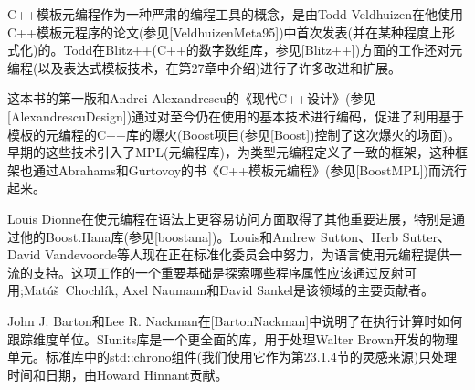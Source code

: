 C++模板元编程作为一种严肃的编程工具的概念，是由Todd Veldhuizen在他使用C++模板元程序的论文(参见[VeldhuizenMeta95])中首次发表(并在某种程度上形式化)的。Todd在Blitz++(C++的数字数组库，参见[Blitz++])方面的工作还对元编程(以及表达式模板技术，在第27章中介绍)进行了许多改进和扩展。

这本书的第一版和Andrei Alexandrescu的《现代C++设计》(参见[AlexandrescuDesign])通过对至今仍在使用的基本技术进行编码，促进了利用基于模板的元编程的C++库的爆火(Boost项目(参见[Boost])控制了这次爆火的场面)。早期的这些技术引入了MPL(元编程库)，为类型元编程定义了一致的框架，这种框架也通过Abrahams和Gurtovoy的书《C++模板元编程》(参见[BoostMPL])而流行起来。

Louis Dionne在使元编程在语法上更容易访问方面取得了其他重要进展，特别是通过他的Boost.Hana库(参见[boostana])。Louis和Andrew Sutton、Herb Sutter、David Vandevoorde等人现在正在标准化委员会中努力，为语言使用元编程提供一流的支持。这项工作的一个重要基础是探索哪些程序属性应该通过反射可用;Mat\'{u}\v{s}\ Chochl\'{i}k, Axel Naumann和David Sankel是该领域的主要贡献者。

John J. Barton和Lee R. Nackman在[BartonNackman]中说明了在执行计算时如何跟踪维度单位。SIunits库是一个更全面的库，用于处理Walter Brown开发的物理单元。标准库中的std::chrono组件(我们使用它作为第23.1.4节的灵感来源)只处理时间和日期，由Howard Hinnant贡献。






























